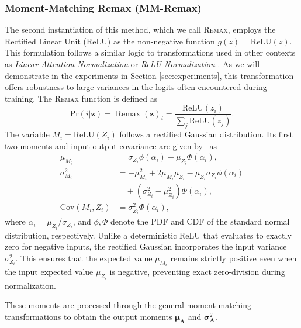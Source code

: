 \documentclass{uai2026} %
\begin{document}
\subsubsection{Moment-Matching Remax (MM-Remax)}\label{sec:mm-remax}
The second instantiation of this method, which we call \textsc{Remax}, employs the Rectified Linear Unit (ReLU) as the non-negative function $g(z) = \text{ReLU}(z)$. This formulation follows a similar logic to transformations used in other contexts as \textit{Linear Attention Normalization} or \textit{ReLU Normalization} \citep{guo2024slab}. As we will demonstrate in the experiments in Section \ref{sec:experiments}, this transformation offers robustness to large variances in the logits often encountered during training. The \textsc{Remax} function is defined as
\begin{equation*}
\text{Pr}(i|\bm{z}) = \operatorname{Remax}(\bm{z})_i = \frac{\text{ReLU}(z_i)}{\sum_j \text{ReLU}(z_j)}.
\end{equation*}
The variable $M_i = \mathrm{ReLU}(Z_i)$ follows a rectified Gaussian distribution. Its first two moments and input-output covariance are given by~\cite{huber2020bayesian} as
\begin{align*}
\mu_{M_i} &= \sigma_{Z_i} \phi(\alpha_i) + \mu_{Z_i} \Phi(\alpha_i), \\
\sigma_{M_i}^2 &= -\mu_{M_i}^2 + 2\mu_{M_i}\mu_{Z_i} - \mu_{Z_i}\sigma_{Z_i} \phi(\alpha_i) \\
&\quad + (\sigma_{Z_i}^2-\mu_{Z_i}^2)\Phi(\alpha_i), \\
\text{Cov}(M_i,Z_i) &= \sigma_{Z_i}^2 \Phi(\alpha_i),
\end{align*}
where $\alpha_i = \mu_{Z_i}/\sigma_{Z_i}$, and $\phi, \Phi$ denote the PDF and CDF of the standard normal distribution, respectively. Unlike a deterministic ReLU that evaluates to exactly zero for negative inputs, the rectified Gaussian incorporates the input variance $\sigma_{Z_i}^2$. This ensures that the expected value $\mu_{M_i}$ remains strictly positive even when the input expected value $\mu_{Z_i}$ is negative, preventing exact zero-division during normalization.

These moments are processed through the general moment-matching transformations to obtain the output moments $\bm{\mu}_{\bm{A}}$ and $\bm{\sigma}_{\bm{A}}^2$.
\end{document}

